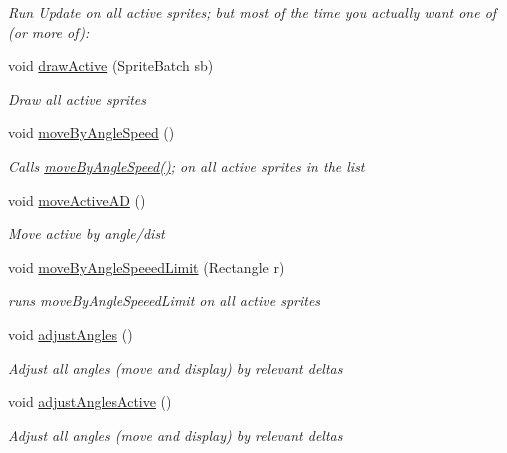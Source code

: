 \begin{DoxyCompactItemize}
\begin{DoxyCompactList}\small\item\em Run Update on all active sprites; but most of the time you actually want one of (or more of)\+: \end{DoxyCompactList}\item 
void \mbox{\hyperlink{class_r_c___framework_1_1_sprite_list_a865a310d536bf2fd0b23f01b84159887}{draw\+Active}} (Sprite\+Batch sb)
\begin{DoxyCompactList}\small\item\em Draw all active sprites \end{DoxyCompactList}\item 
void \mbox{\hyperlink{class_r_c___framework_1_1_sprite_list_a5467136da9d231b4e99444adb5f52470}{move\+By\+Angle\+Speed}} ()
\begin{DoxyCompactList}\small\item\em Calls \mbox{\hyperlink{class_r_c___framework_1_1_sprite_list_a5467136da9d231b4e99444adb5f52470}{move\+By\+Angle\+Speed()}}; on all active sprites in the list \end{DoxyCompactList}\item 
void \mbox{\hyperlink{class_r_c___framework_1_1_sprite_list_a9d1b368c9d6d8e340e66faa06c63e5dd}{move\+Active\+AD}} ()
\begin{DoxyCompactList}\small\item\em Move active by angle/dist \end{DoxyCompactList}\item 
void \mbox{\hyperlink{class_r_c___framework_1_1_sprite_list_a1ad88a094e1efbdd75de18f8f1d49db1}{move\+By\+Angle\+Speeed\+Limit}} (Rectangle r)
\begin{DoxyCompactList}\small\item\em runs move\+By\+Angle\+Speeed\+Limit on all active sprites \end{DoxyCompactList}\item 
void \mbox{\hyperlink{class_r_c___framework_1_1_sprite_list_a91c1c36f7a1b321e6a1351fddd9c7e3e}{adjust\+Angles}} ()
\begin{DoxyCompactList}\small\item\em Adjust all angles (move and display) by relevant deltas \end{DoxyCompactList}\item 
void \mbox{\hyperlink{class_r_c___framework_1_1_sprite_list_a0d85e7ec742d8326291f6d51ab0e0b0e}{adjust\+Angles\+Active}} ()
\begin{DoxyCompactList}\small\item\em Adjust all angles (move and display) by relevant deltas \end{DoxyCompactList}\item 

\end{DoxyCompactItemize}
